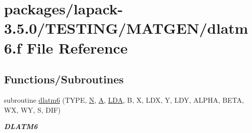 \hypertarget{dlatm6_8f}{}\section{packages/lapack-\/3.5.0/\+T\+E\+S\+T\+I\+N\+G/\+M\+A\+T\+G\+E\+N/dlatm6.f File Reference}
\label{dlatm6_8f}
\subsection*{Functions/\+Subroutines}
\begin{DoxyCompactItemize}
\item 
subroutine \hyperlink{group__double__matgen_gaabd1a22d830fde1eca3dfb5f61f05e16}{dlatm6} (T\+Y\+P\+E, \hyperlink{polmisc_8c_a0240ac851181b84ac374872dc5434ee4}{N}, \hyperlink{classA}{A}, \hyperlink{example__user_8c_ae946da542ce0db94dced19b2ecefd1aa}{L\+D\+A}, B, X, L\+D\+X, Y, L\+D\+Y, A\+L\+P\+H\+A, B\+E\+T\+A, W\+X, W\+Y, S, D\+I\+F)
\begin{DoxyCompactList}\small\item\em {\bfseries D\+L\+A\+T\+M6} \end{DoxyCompactList}\end{DoxyCompactItemize}
